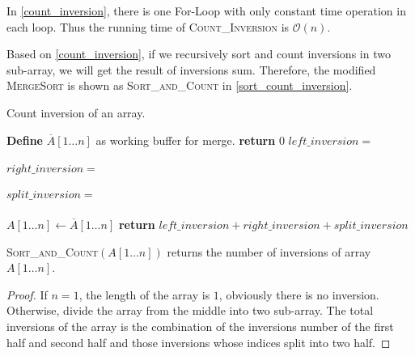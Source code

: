 \begin{homeworkProblem}
In \cref{count_inversion}, there is one For-Loop with only constant time operation
in each loop. Thus the running time of \textsc{Count\_Inversion} is $\mathcal{O}(n)$.

Based on \cref{count_inversion}, if we recursively sort and count inversions in two
sub-array, we will get the result of inversions sum. Therefore, the modified
\textsc{MergeSort} is shown as \textsc{Sort\_and\_Count} in \cref{sort_count_inversion}.

\begin{algorithm}[H]
    \caption{Count inversion of an array.} \label{sort_count_inversion}
    \begin{algorithmic}[1]
            \State \textbf{Define} $\overline{A}[1 \ldots n]$ as working buffer for merge.
             
                \State \textbf{return} 0
            \Else {}
                \State $left\_inversion=$
                    \\\\
                \State $right\_inversion=$
                    \\\\
                \State $split\_inversion=$\Call{Count\_Inversions}{$\overline{A}[1 \ldots n]$, $A[1 \ldots \lfloor n/2 \rfloor$, $A[\lfloor n/2 \rfloor + 1 \ldots n]$}
                    \\\\
                \State $A[1 \ldots n] \leftarrow \overline{A}[1 \ldots n]$
            \EndIf
        \State \textbf{return } $left\_inversion + right\_inversion + split\_inversion$
        \EndProcedure
    \end{algorithmic}
\end{algorithm}


\Claim \textsc{Sort\_and\_Count}$(A[1 \ldots n])$ returns the number of inversions of array $A[1 \ldots n]$.

\begin{proof}
    If $n = 1$, the length of the array is $1$, obviously there is no inversion.
    Otherwise, divide the array from the middle into two sub-array. The total
    inversions of the array is the combination of the inversions number of the 
    first half and second half and those inversions whose indices split into two half.


\end{proof}
\end{homeworkProblem}
